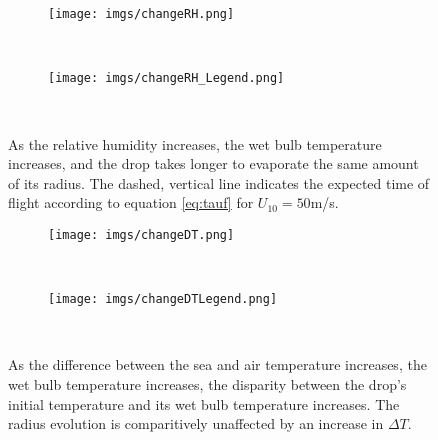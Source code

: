 \documentclass[10pt,a4paper]{article}
\begin{document}
\begin{figure}[h!]
    \centering
    \begin{subfigure}[t!]{0.75\textwidth}
        \texttt{[image: imgs/changeRH.png]}        
    \end{subfigure}
    ~ %
    \begin{subfigure}[t!]{0.2\textwidth}
        \texttt{[image: imgs/changeRH\_Legend.png]}        
    \end{subfigure}
    ~ %
       \caption{As the relative humidity increases, the wet bulb temperature increases, and the drop takes longer to evaporate the same amount of its radius. The dashed, vertical line indicates the expected time of flight according to equation \ref{eq:tauf} for $U_{10} = 50$m/s.  \label{fig:changeRH}}
\end{figure}

\begin{figure}[h!]
    \centering
    \begin{subfigure}[t!]{0.75\textwidth}
        \texttt{[image: imgs/changeDT.png]}        
    \end{subfigure}
    ~ %
    \begin{subfigure}[t!]{0.23\textwidth}
        \texttt{[image: imgs/changeDTLegend.png]}        
    \end{subfigure}
    ~ %
       \caption{As the difference between the sea and air temperature increases, the wet bulb temperature increases, the disparity between the drop's initial temperature and its wet bulb temperature increases. The radius evolution is comparitively unaffected by an increase in $\Delta T$.\label{fig:changeDT}}
\end{figure}
\end{document}
